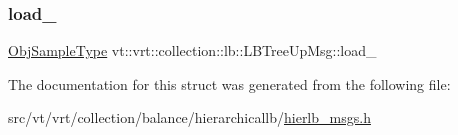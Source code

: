 \mbox{\label{structvt_1_1vrt_1_1collection_1_1lb_1_1_l_b_tree_up_msg_a9ed67bba04ee9261cb5d4a929170e28c}} 
\subsubsection{\texorpdfstring{load\+\_\+}{load\_}}
{\footnotesize\ttfamily \hyperlink{structvt_1_1vrt_1_1collection_1_1lb_1_1_hier_l_b_types_a597a60d517207b90e8c7984eac434e8f}{Obj\+Sample\+Type} vt\+::vrt\+::collection\+::lb\+::\+L\+B\+Tree\+Up\+Msg\+::load\+\_\+\hspace{0.3cm}{\ttfamily [private]}}



The documentation for this struct was generated from the following file\+:\begin{DoxyCompactItemize}
\item 
src/vt/vrt/collection/balance/hierarchicallb/\hyperlink{hierlb__msgs_8h}{hierlb\+\_\+msgs.\+h}\end{DoxyCompactItemize}
